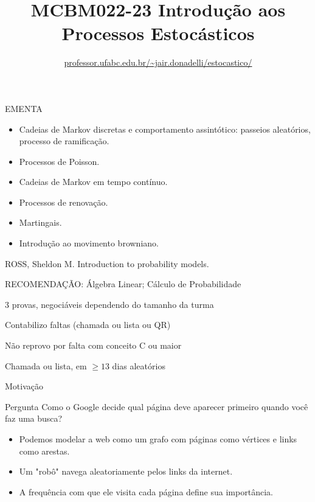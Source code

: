 \documentclass{beamer}
\title{MCBM022-23 Introdução aos Processos Estocásticos}
\subtitle{\url{professor.ufabc.edu.br/~jair.donadelli/estocastico/}}
\date{}
\begin{document}
\frame{\titlepage}

\begin{frame}{EMENTA}

  \begin{itemize}
  \item Cadeias de Markov discretas e comportamento assintótico:
    passeios aleatórios, processo de ramificação.
  \item Processos de Poisson. 
  \item Cadeias de Markov em tempo contínuo. 
  \item Processos de renovação. 
  \item Martingais. 
  \item Introdução ao movimento browniano.
  \end{itemize}


  \vfill

  ROSS, Sheldon M. Introduction to probability models.
  
  \vfill

  RECOMENDAÇÃO: Álgebra Linear; Cálculo de Probabilidade 
  
\end{frame}


\begin{frame}

  \vfill
  
  3 provas, negociáveis dependendo do tamanho da turma

  \vfill
  
  Contabilizo faltas  (chamada ou lista ou QR) 

  \vfill

  Não reprovo por falta com conceito C ou maior
  
  \vfill

  Chamada ou lista,  em $\geq 13$ dias aleatórios

  \vfill
  
\end{frame}


\begin{frame}{Motivação}
\begin{block}{Pergunta}
Como o Google decide qual página deve aparecer primeiro quando você faz uma busca?
\end{block}
\pause
\begin{itemize}
    \item Podemos modelar a web como um grafo com páginas como vértices e links como arestas.
    \item Um "robô" navega aleatoriamente pelos links da internet.
    \item A frequência com que ele visita cada página define sua importância.
\end{itemize}
\end{frame}
\end{document}
